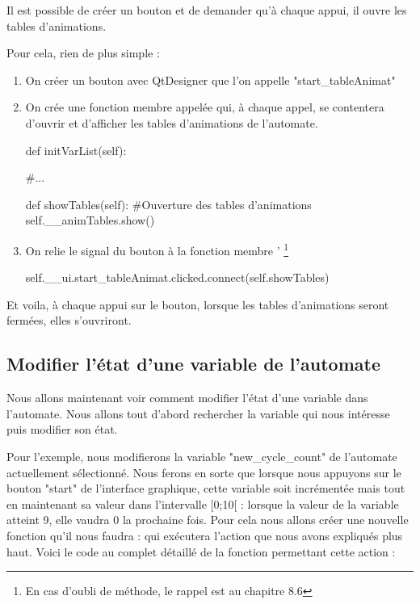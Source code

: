 \documentclass[12pt]{report}    %
\begin{document}
Il est possible de créer un bouton et de demander qu'à chaque appui, il ouvre les tables d'animations.

Pour cela, rien de plus simple :

\begin{enumerate}
    \item On créer un bouton avec QtDesigner que l'on appelle "start\_tableAnimat"
    \item On crée une fonction membre appelée  qui, à chaque appel, se contentera d'ouvrir et d'afficher les tables d'animations de l'automate.
    
    \begin{pyCode}
        def initVarList(self):
        
            #...
        
        def showTables(self):
            #Ouverture des tables d'animations
            self.__animTables.show()
    \end{pyCode}
    \item On relie le signal du bouton à la fonction membre  ' \footnote{En cas d'oubli de méthode, le rappel est au chapitre 8.6}
    
    \begin{pyCode}
        self.__ui.start_tableAnimat.clicked.connect(self.showTables)
    \end{pyCode}
   
\end{enumerate}

Et voila, à chaque appui sur le bouton, lorsque les tables d'animations seront fermées, elles s'ouvriront.

\subsection{Modifier l'état d'une variable de l'automate}

Nous allons maintenant voir comment modifier l'état d'une variable dans l'automate.\newline
Nous allons tout d'abord rechercher la variable qui nous intéresse puis modifier son état.\smallSkip

Pour l'exemple, nous modifierons la variable "new\_cycle\_count" de l'automate actuellement sélectionné.\newline
Nous ferons en sorte que lorsque nous appuyons sur le bouton "start" de l'interface graphique, cette variable soit incrémentée mais tout en maintenant sa valeur dans l'intervalle [0;10[ : lorsque la valeur de la variable atteint 9, elle vaudra 0 la prochaine fois.\newline
Pour cela nous allons créer une nouvelle fonction qu'il nous faudra  :  qui exécutera l'action que nous avons expliqués plus haut.\smallSkip
Voici le code au complet détaillé de la fonction permettant cette action :
\end{document}
